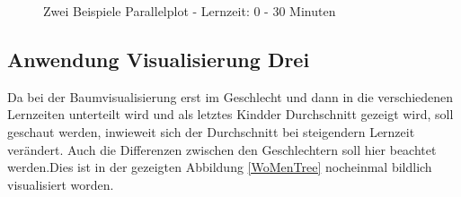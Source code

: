 \documentclass[usegeometry=true]{scrartcl}
\begin{document}
\begin{figure}
\begin{center}
\caption{Zwei Beispiele Parallelplot - Lernzeit: 0 - 30 Minuten}
\label{BspPar}
\end{center}
\end{figure}



\subsection{Anwendung Visualisierung Drei}
\label{AnwDrei}

Da bei der Baumvisualisierung erst im Geschlecht und dann in die verschiedenen Lernzeiten unterteilt wird und als letztes \glqq Kind\grqq der Durchschnitt gezeigt wird, soll geschaut werden, inwieweit sich der Durchschnitt bei steigendern Lernzeit verändert. Auch die Differenzen zwischen den Geschlechtern soll hier beachtet werden.Dies ist in der gezeigten Abbildung \ref{WoMenTree} nocheinmal bildlich visualisiert worden.
\end{document}
